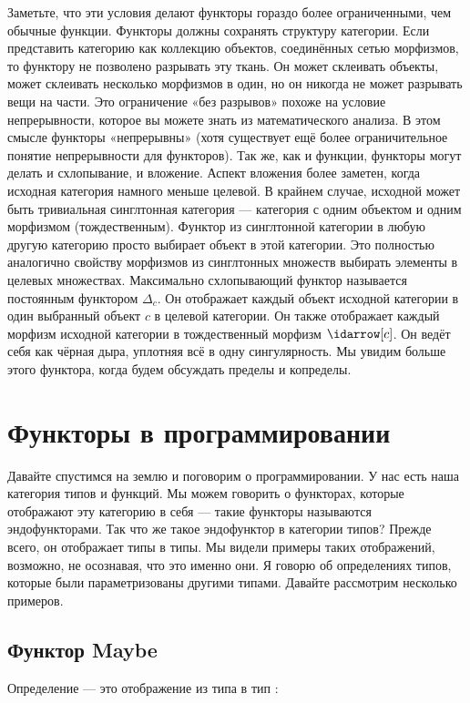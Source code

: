 \noindent
Заметьте, что эти условия делают функторы гораздо более ограниченными, чем обычные функции. Функторы должны сохранять структуру категории. Если представить категорию как коллекцию объектов, соединённых сетью морфизмов, то функтору не позволено разрывать эту ткань. Он может склеивать объекты, может склеивать несколько морфизмов в один, но он никогда не может разрывать вещи на части. Это ограничение «без разрывов» похоже на условие непрерывности, которое вы можете знать из математического анализа. В этом смысле функторы «непрерывны» (хотя существует ещё более ограничительное понятие непрерывности для функторов). Так же, как и функции, функторы могут делать и схлопывание, и вложение. Аспект вложения более заметен, когда исходная категория намного меньше целевой. В крайнем случае, исходной может быть тривиальная синглтонная категория — категория с одним объектом и одним морфизмом (тождественным). Функтор из синглтонной категории в любую другую категорию просто выбирает объект в этой категории. Это полностью аналогично свойству морфизмов из синглтонных множеств выбирать элементы в целевых множествах. Максимально схлопывающий функтор называется постоянным функтором $\Delta_c$. Он отображает каждый объект исходной категории в один выбранный объект $c$ в целевой категории. Он также отображает каждый морфизм исходной категории в тождественный морфизм $\idarrow[c]$. Он ведёт себя как чёрная дыра, уплотняя всё в одну сингулярность. Мы увидим больше этого функтора, когда будем обсуждать пределы и копределы.

\section{Функторы в программировании}

Давайте спустимся на землю и поговорим о программировании. У нас есть наша категория типов и функций. Мы можем говорить о функторах, которые отображают эту категорию в себя — такие функторы называются эндофункторами. Так что же такое эндофунктор в категории типов? Прежде всего, он отображает типы в типы. Мы видели примеры таких отображений, возможно, не осознавая, что это именно они. Я говорю об определениях типов, которые были параметризованы другими типами. Давайте рассмотрим несколько примеров.

\subsection{Функтор Maybe}

Определение  — это отображение из типа  в тип :

